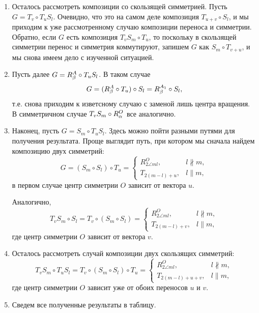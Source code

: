 \begin{enumerate}
\item Осталось рассмотреть композиции со скользящей симметрией. Пусть $G=T_v\circ T_uS_l$. Очевидно, что это на самом деле композиция $T_{u+v}\circ S_l$, и мы приходим к уже рассмотренному случаю композиции переноса и симметрии. Обратно, если $G$ есть композиция $T_vS_m\circ T_u$, то поскольку в скользящей симметрии перенос и симметрия коммутируют, запишем $G$ как
$S_m\circ T_{v+u}$, и мы снова имеем дело с изученной ситуацией.

\item Пусть далее $G=R_\beta^A\circ T_uS_l$. В таком случае
$$
G = (R_\beta^A\circ T_u)\circ S_l = R_\beta^{A_1}\circ S_l,
$$
т.е. снова приходим к изветсному случаю с заменой лишь центра вращения. В симметричном случае $T_vS_m\circ R_\alpha^O$ все аналогично.

\item Наконец, пусть $G=S_m\circ T_uS_l$. Здесь можно пойти разными путями для получения результата. Проще выглядит путь, при котором мы сначала найдем композицию двух симметрий:
$$
G = (S_m\circ S_l)\circ T_u = \begin{cases} R_{2\angle ml}^O, & l\not\parallel m, \\
T_{2(m-l)+u}, & l\parallel m,\end{cases}
$$
в первом случае центр симметрии $O$ зависит от вектора $u$.

Аналогично,
$$
T_vS_m\circ S_l = T_v\circ(S_m\circ S_l) = \begin{cases} R_{2\angle ml}^O, & l\not\parallel m, \\
T_{2(m-l)+v}, & l\parallel m,\end{cases}
$$
где центр симметрии $O$ зависит от вектора $v$.

\item Осталось рассмотреть случай композиции двух скользящих симметрий:
$$
T_vS_m\circ T_uS_l = T_v\circ(S_m\circ S_l)\circ T_u =\begin{cases} R_{2\angle ml}^O, & l\not\parallel m, \\
T_{2(m-l)+u+v}, & l\parallel m,\end{cases}
$$
где центр симметрии $O$ зависит уже от обоих переносов $u$ и $v$.

\item Сведем все полученные результаты в таблицу.


\end{enumerate}
